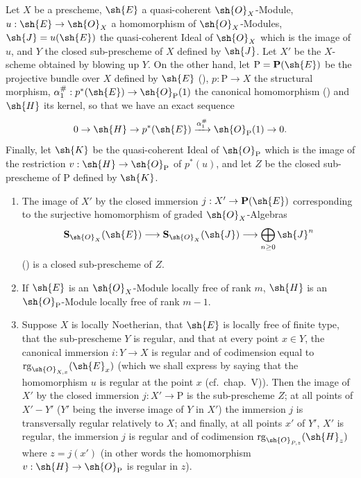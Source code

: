\begin{proposition}[19.4.11]
\label{IV.19.4.11}
Let $X$ be a prescheme, $\sh{E}$ a quasi-coherent $\sh{O}_X$-Module, $u:\sh{E}\to\sh{O}_X$ a homomorphism of $\sh{O}_X$-Modules, $\sh{J}=u(\sh{E})$ the quasi-coherent Ideal of $\sh{O}_X$ which is the image of $u$, and $Y$ the closed sub-prescheme of $X$ defined by $\sh{J}$. Let $X'$ be the $X$-scheme obtained by blowing up $Y$.
On the other hand, let $\mathrm{P}=\mathbf{P}(\sh{E})$ be the projective bundle over $X$ defined by $\sh{E}$ (), $p:\mathrm{P}\to X$ the structural morphism, $\alpha_1^{\#}:p^*(\sh{E})\to\sh{O}_{\mathrm{P}}(1)$ the canonical homomorphism () and $\sh{H}$ its kernel, so that we have an exact sequence
\[
  0\to\sh{H}\to p^*(\sh{E})\xrightarrow{\alpha_1^{\#}}\sh{O}_{\mathrm{P}}(1)\to 0.
\]
Finally, let $\sh{K}$ be the quasi-coherent Ideal of $\sh{O}_{\mathrm{P}}$ which is the image of the restriction $v:\sh{H}\to\sh{O}_{\mathrm{P}}$ of $p^*(u)$, and let $Z$ be the closed sub-prescheme of $\mathrm{P}$ defined by $\sh{K}$.
\begin{enumerate}[label=(\roman*)]
  \item The image of $X'$ by the closed immersion $j:X'\to\mathbf{P}(\sh{E})$ corresponding to the surjective homomorphism of graded $\sh{O}_X$-Algebras
  \[
    \mathbf{S}_{\sh{O}_X}(\sh{E})\longrightarrow\mathbf{S}_{\sh{O}_X}(\sh{J})\longrightarrow\bigoplus_{n\geq 0}\sh{J}^n
  \]
  () is a closed sub-prescheme of $Z$.
  \item If $\sh{E}$ is an $\sh{O}_X$-Module locally free of rank $m$, $\sh{H}$ is an $\sh{O}_{\mathrm{P}}$-Module locally free of rank $m-1$.
  \item Suppose $X$ is locally Noetherian, that $\sh{E}$ is locally free of finite type, that the sub-prescheme $Y$ is regular, and that at every point $x\in Y$, the canonical immersion $i:Y\to X$ is regular and of codimension equal to $\operatorname{rg}_{\sh{O}_{X,x}}(\sh{E}_x)$ (which we shall express by saying that the homomorphism $u$ is regular at the point $x$ (cf.\ chap.~V)).
Then the image of $X'$ by the closed immersion $j:X'\to\mathrm{P}$ is the sub-prescheme $Z$; at all points of $X'-Y'$ ($Y'$ being the inverse image of $Y$ in $X'$) the immersion $j$ is transversally regular relatively to $X$; and finally, at all points $x'$ of $Y'$, $X'$ is regular, the immersion $j$ is regular and of codimension $\operatorname{rg}_{\sh{O}_{P,z}}(\sh{H}_z)$ where $z=j(x')$ (in other words the homomorphism $v:\sh{H}\to\sh{O}_{\mathrm{P}}$ is regular in $z$).
\end{enumerate}
\end{proposition}

